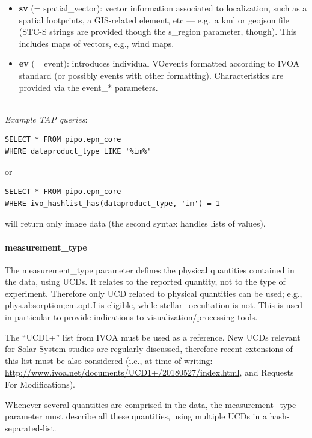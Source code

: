 \documentclass[11pt,a4paper]{ivoa}
\begin{document}
\begin{itemize}
\item \textbf{sv} (= spatial\_vector): vector information associated
to localization, such as a spatial footprints, a GIS-related element,
etc —  e.g.\ a kml or geojson file (STC-S strings are provided though
the s\_region parameter, though). This includes maps of vectors, e.g.,
wind maps.

\item \textbf{ev} (= event): introduces individual VOevents
formatted according to IVOA standard (or possibly events with other
formatting). Characteristics are provided via the event\_* parameters.

\end{itemize}

\textbf{\\}
\emph{Example TAP queries}:

\begin{verbatim}
SELECT * FROM pipo.epn_core
WHERE dataproduct_type LIKE '%im%'
\end{verbatim}

or

\begin{verbatim}
SELECT * FROM pipo.epn_core
WHERE ivo_hashlist_has(dataproduct_type, 'im') = 1
\end{verbatim}

will return only image data (the second syntax handles lists of values).

\paragraph{measurement\_type}

The measurement\_type parameter defines the physical quantities
contained in the data, using UCDs. It relates to the reported quantity,
not to the type of experiment. Therefore only UCD related to physical
quantities can be used; e.g., phys.absorption;em.opt.I is eligible,
while stellar\_occultation is not. This is used in particular to provide
indications to visualization/processing tools.

The ``UCD1+'' list from IVOA must be used as a
reference. New UCDs relevant for Solar System studies
are regularly discussed, therefore recent extensions
of this list must be also considered (i.e., at time of writing:
\url{http://www.ivoa.net/documents/UCD1+/20180527/index.html},
and Requests For Modifications).

Whenever several quantities are comprised in the data, the
measurement\_type parameter must describe all these quantities, using
multiple UCDs in a hash-separated-list.
\end{document}
